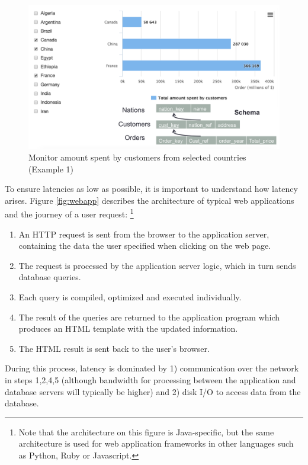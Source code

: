 \begin{figure}[t]
\centering
\includegraphics[width=14cm]{images/RunningExample.png}
\caption{Monitor amount spent by customers from selected countries (Example 1)}
\label{fig:example1}
\end{figure}

To ensure latencies as low as possible, it is important to understand how latency arises. Figure \ref{fig:webapp} describes the architecture of typical web applications and the journey of a user request: \footnote{Note that the architecture on this figure is Java-specific, but the same architecture is used for web application frameworks in other languages such as Python, Ruby or Javascript.} \
\begin{enumerate}
\item{An HTTP request is sent from the browser to the application server, containing the data the user specified when clicking on the web page.}
\item{The request is processed by the application server logic, which in turn sends database queries.}
\item{Each query is compiled, optimized and executed individually.}
\item{The result of the queries are returned to the application program which produces an HTML template with the updated information.}
\item{The HTML result is sent back to the user's browser.}
\end{enumerate}
During this process, latency is dominated by 1) communication over the network in steps 1,2,4,5 (although bandwidth for processing between the application and database servers will typically be higher) and 2) disk I/O to access data from the database.


